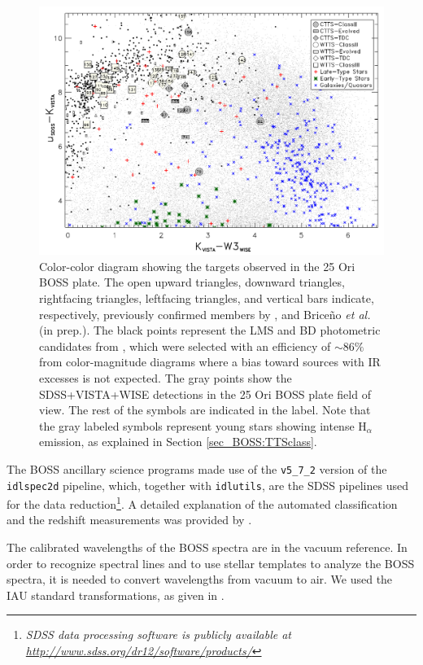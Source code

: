 \documentclass[12pt]{article}
\begin{document}
\begin{figure}[ht!]
	\centering
	\includegraphics[width=1.\textwidth]{f2.pdf}
	\caption[Color-color diagram of the targets in the 25 Ori BOSS plate]{Color-color diagram showing the targets observed in the 25 Ori BOSS plate. The open upward triangles, downward triangles, rightfacing triangles, leftfacing triangles, and vertical bars indicate, respectively, previously confirmed members by \citet{Briceno2005,  Briceno2007, Downes2014, Downes2015}, and Brice\~no \textit {et al.} (in prep.). The black points represent the LMS and BD photometric candidates from \citet{Downes2014}, which were selected with an efficiency of $\sim 86\%$ from color-magnitude diagrams where a bias toward sources with IR excesses is not expected. The gray points show the SDSS+VISTA+WISE detections in the 25 Ori BOSS plate field of view. The rest of the symbols are indicated in the label. Note that the gray labeled symbols represent young stars showing intense H$_\alpha$ emission, as explained in Section \ref{sec_BOSS:TTSclass}.}
	\label{fig_BOSS:CCD_bias}
\end{figure}

The BOSS ancillary science programs made use of the \texttt{v5\_7\_2} version of the \texttt{idlspec2d} pipeline, which, together with \texttt{idlutils}, are the SDSS pipelines used for the data reduction\footnote {\emph{\footnotesize SDSS data processing software is publicly available at \url{http://www.sdss.org/dr12/software/products/}}}. A detailed explanation of the automated classification and the redshift measurements was provided by \citet{Bolton2012}.

The calibrated wavelengths of the BOSS spectra are in the vacuum reference. In order to recognize spectral lines and to use stellar templates to analyze the BOSS spectra, it is needed to convert wavelengths from vacuum to air. We used the IAU standard transformations, as given in \citet{Morton1991}.
\end{document}

